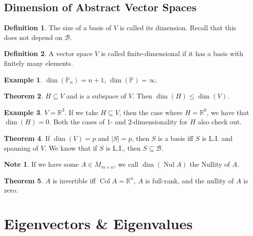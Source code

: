 \documentclass{article}
\numberwithin{equation}{section}
\theoremstyle{definition}
\newtheorem{thm}{Theorem}[subsection]
\newtheorem{defn}{Definition}[subsection]
\newtheorem{ex}[thm]{Example}
\newtheorem{note}{Note}[subsection]
\newcommand{\len}[1]{|#1|}
\newcommand{\R}{\mathbb{R}}
\newcommand{\B}{\mathcal{B}}
\DeclareMathOperator{\nul}{Nul}
\DeclareMathOperator{\col}{Col}
\newcommand{\x}{\times}
\theoremstyle{adefn}
\begin{document}
	\subsection{Dimension of Abstract Vector Spaces}
	\begin{defn}
		The size of a basis of $V$ is called its dimension. Recall that this does not depend on $\mathcal{B}$. 
	\end{defn}
	\begin{defn}
		A vector space $V$ is called finite-dimensional if it has a basis with finitely many elements.
	\end{defn}
	\begin{ex}
		$\dim(\mathbb{P}_n) = n+1$, $\dim(\mathbb{P}) = \infty$. 
	\end{ex}
	\begin{thm}
		$H \subseteq V$ and is a subspace of $V$. Then $\dim(H) \leq \dim(V)$. 
	\end{thm}
	\begin{ex}
		$V = \R^3$. If we take $H \subseteq V$, then the case where $H = \R^0$, we have that $\dim(H) = 0$. Both the cases of 1- and 2-dimensionality for $H$ also check out. 
	\end{ex}
	\begin{thm}
		If $\dim(V) = p$ and $\len{S} = p$, then $S$ is a basis iff $S$ is L.I. and spanning of $V$. We know that if $S$ is L.I., then $S \subseteq \B$. 
	\end{thm}
	\begin{note}
		If we have some $A \in M_{m\x n}$, we call $\dim(\nul A)$ the Nullity of $A$. 
	\end{note}
	\begin{thm}
		$A$ is invertible iff $\col A = \R^n$, $A$ is full-rank, and the nullity of $A$ is zero. 
	\end{thm}
	
	\section{Eigenvectors \& Eigenvalues}
\end{document}
